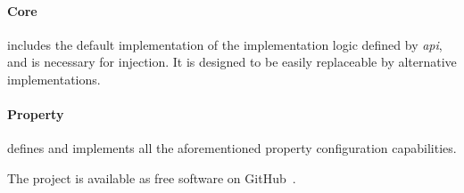 	\paragraph{Core} includes the default implementation of the implementation logic defined by \emph{api}, and is necessary for injection. It is designed to be easily replaceable by alternative implementations.
	
	\paragraph{Property} defines and implements all the aforementioned property configuration capabilities.
	
	\bigbreak
	The project is available as free software on GitHub~\cite{Kreator}.	
	
%













